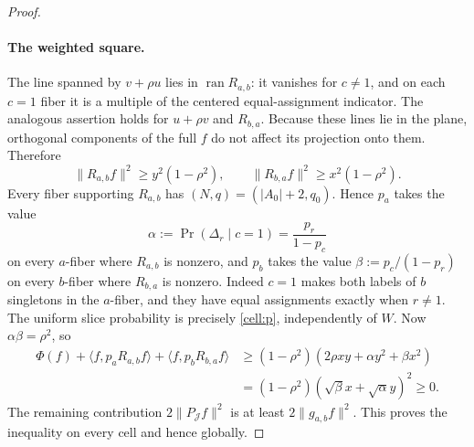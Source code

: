 \begin{proof}
\paragraph{The weighted square.}
The line spanned by $v+\rho u$ lies in $\operatorname{ran}R_{a,b}$: it
vanishes for $c\ne1$, and on each $c=1$ fiber it is a multiple of the centered
equal-assignment indicator. The analogous assertion holds for $u+\rho v$ and
$R_{b,a}$. Because these lines lie in the plane, orthogonal components of the
full $f$ do not affect its projection onto them. Therefore
\[
 \lVert R_{a,b}f\rVert^2\ge y^2(1-\rho^2),\qquad
 \lVert R_{b,a}f\rVert^2\ge x^2(1-\rho^2).
\]
Every fiber supporting $R_{a,b}$ has $(N,q)=(|A_0|+2,q_0)$. Hence $p_a$
takes the value
\[
 \alpha:=\Pr(\Delta_r\mid c=1)=\frac{p_r}{1-p_c}
\]
on every $a$-fiber where $R_{a,b}$ is nonzero, and $p_b$ takes the value
$\beta:=p_c/(1-p_r)$ on every $b$-fiber where $R_{b,a}$ is nonzero.
Indeed $c=1$ makes both labels of $b$ singletons in the $a$-fiber, and they
have equal assignments exactly when $r\ne1$. The uniform slice probability
is precisely \eqref{cell:p}, independently of $W$. Now $\alpha\beta=\rho^2$,
so
\begin{align*}
 \Phi(f)+\langle f,p_aR_{a,b}f\rangle+\langle f,p_bR_{b,a}f\rangle
 &\ge(1-\rho^2)(2\rho xy+\alpha y^2+\beta x^2)\\
 &=(1-\rho^2)(\sqrt\beta x+\sqrt\alpha y)^2\ge0.
\end{align*}
The remaining contribution $2\lVert P_{\mathcal J}f\rVert^2$ is at least
$2\lVert g_{a,b}f\rVert^2$. This proves the inequality on every cell and
hence globally.
\end{proof}
